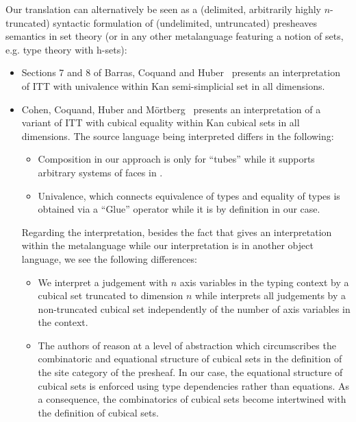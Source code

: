 \documentclass{article}
\begin{document}
Our translation can alternatively be seen as a (delimited, arbitrarily
highly $n$-truncated) syntactic formulation of (undelimited,
untruncated) presheaves semantics in set theory (or in any other
metalanguage featuring a notion of sets, e.g. type theory with
h-sets):
\begin{itemize}
\item Sections 7 and 8 of Barras, Coquand and
  Huber~\cite{BarrasCoquandHuber15} presents an interpretation of ITT
  with univalence within Kan semi-simplicial set in all dimensions.
\item Cohen, Coquand, Huber and M\"ortberg~\cite{CohCoqHubMor16}
  presents an interpretation of a variant of ITT with cubical equality
  within Kan cubical sets in all dimensions. The source language being
  interpreted differs in the following:
  \begin{itemize}
  \item Composition in our approach is only for ``tubes'' while it
    supports arbitrary systems of faces in \cite{CohCoqHubMor16}.
  \item Univalence, which connects equivalence of types and equality
    of types is obtained via a ``Glue'' operator while it is by
    definition in our case.
  \end{itemize}
 Regarding the interpretation, besides the fact that
 \cite{CohCoqHubMor16} gives an interpretation within the metalanguage
 while our interpretation is in another object language, we see the
 following differences:
 \begin{itemize}
 \item We interpret a judgement with $n$ axis variables in the typing
   context by a cubical set truncated to dimension $n$ while
   \cite{CohCoqHubMor16} interprets all judgements by a non-truncated
   cubical set independently of the number of axis variables in the
   context.
 \item The authors of \cite{CohCoqHubMor16} reason at a level of
   abstraction which circumscribes the combinatoric and equational
   structure of cubical sets in the definition of the site category of
   the presheaf. In our case, the equational structure of cubical sets
   is enforced using type dependencies rather than equations. As a
   consequence, the combinatorics of cubical sets become intertwined
   with the definition of cubical sets.


\end{itemize}
\end{itemize}
\end{document}
